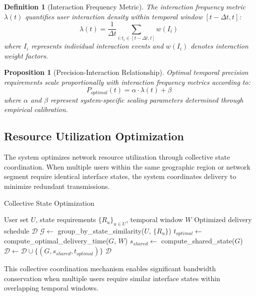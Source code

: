 \documentclass[12pt,a4paper]{article}
\newtheorem{definition}{Definition}
\newtheorem{proposition}{Proposition}
\begin{document}
\begin{definition}[Interaction Frequency Metric]
The interaction frequency metric $\lambda(t)$ quantifies user interaction density within temporal window $[t-\Delta t, t]$:
\begin{equation}
\lambda(t) = \frac{1}{\Delta t} \sum_{i: t_i \in [t-\Delta t, t]} w(I_i)
\end{equation}
where $I_i$ represents individual interaction events and $w(I_i)$ denotes interaction weight factors.
\end{definition}

\begin{proposition}[Precision-Interaction Relationship]
Optimal temporal precision requirements scale proportionally with interaction frequency metrics according to:
\begin{equation}
P_{optimal}(t) = \alpha \cdot \lambda(t) + \beta
\end{equation}
where $\alpha$ and $\beta$ represent system-specific scaling parameters determined through empirical calibration.
\end{proposition}

\subsection{Resource Utilization Optimization}

The system optimizes network resource utilization through collective state coordination. When multiple users within the same geographic region or network segment require identical interface states, the system coordinates delivery to minimize redundant transmissions.

\begin{algorithm}
\caption{Collective State Optimization}
\begin{algorithmic}[1]
\Require User set $U$, state requirements $\{R_u\}_{u \in U}$, temporal window $W$
\Ensure Optimized delivery schedule $\mathcal{D}$
\State $\mathcal{G} \leftarrow$ group\_by\_state\_similarity($U$, $\{R_u\}$)
    \State $t_{optimal} \leftarrow$ compute\_optimal\_delivery\_time($G$, $W$)
    \State $s_{shared} \leftarrow$ compute\_shared\_state($G$)
    \State $\mathcal{D} \leftarrow \mathcal{D} \cup \{(G, s_{shared}, t_{optimal})\}$
\EndFor
\State \Return $\mathcal{D}$
\end{algorithmic}
\end{algorithm}

This collective coordination mechanism enables significant bandwidth conservation when multiple users require similar interface states within overlapping temporal windows.
\end{document}
